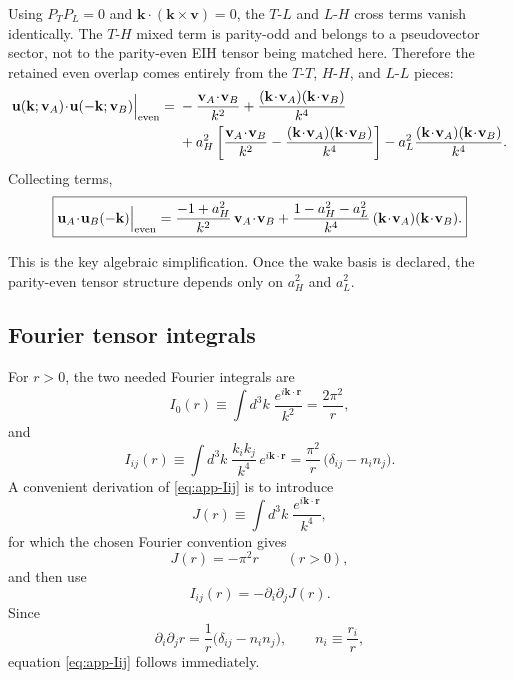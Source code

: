 \documentclass[11pt]{article}
\newcommand{\vct}{\mathbf v}
\begin{document}
Using \(P_TP_L=0\) and \(\mathbf k\!\cdot\!(\mathbf k\times\vct)=0\), the
\(T\)-\(L\) and \(L\)-\(H\) cross terms vanish identically. The \(T\)-\(H\) mixed term is
parity-odd and belongs to a pseudovector sector, not to the parity-even EIH tensor being
matched here. Therefore the retained even overlap comes entirely from the
\(T\)-\(T\), \(H\)-\(H\), and \(L\)-\(L\) pieces:
\begin{align}
\mathbf u(\mathbf k;\vct_A)\!\cdot\!\mathbf u(-\mathbf k;\vct_B)\Big|_{\rm even}
={}&
-\frac{\vct_A\!\cdot\!\vct_B}{k^2}
+\frac{(\mathbf k\!\cdot\!\vct_A)(\mathbf k\!\cdot\!\vct_B)}{k^4}
\nonumber\\
&
+a_H^2
\left[
\frac{\vct_A\!\cdot\!\vct_B}{k^2}
-\frac{(\mathbf k\!\cdot\!\vct_A)(\mathbf k\!\cdot\!\vct_B)}{k^4}
\right]
-a_L^2\frac{(\mathbf k\!\cdot\!\vct_A)(\mathbf k\!\cdot\!\vct_B)}{k^4}.
\label{eq:app-overlap-even-raw}
\end{align}
Collecting terms,
\begin{equation}
\boxed{
\mathbf u_A\!\cdot\!\mathbf u_B(-\mathbf k)\Big|_{\rm even}
=
\frac{-1+a_H^2}{k^2}\,\vct_A\!\cdot\!\vct_B
+
\frac{1-a_H^2-a_L^2}{k^4}\,
(\mathbf k\!\cdot\!\vct_A)(\mathbf k\!\cdot\!\vct_B).
}
\label{eq:app-overlap-even-collected}
\end{equation}

This is the key algebraic simplification. Once the wake basis is declared, the parity-even
tensor structure depends only on \(a_H^2\) and \(a_L^2\).

\subsection{Fourier tensor integrals}
\label{app:wake-fourier-integrals}

For \(r>0\), the two needed Fourier integrals are
\begin{equation}
I_0(r)
\equiv
\int d^3k\;\frac{e^{i\mathbf k\cdot\mathbf r}}{k^2}
=
\frac{2\pi^2}{r},
\label{eq:app-I0}
\end{equation}
and
\begin{equation}
I_{ij}(r)
\equiv
\int d^3k\;\frac{k_i k_j}{k^4}\,e^{i\mathbf k\cdot\mathbf r}
=
\frac{\pi^2}{r}\,\bigl(\delta_{ij}-n_i n_j\bigr).
\label{eq:app-Iij}
\end{equation}
A convenient derivation of \eqref{eq:app-Iij} is to introduce
\begin{equation}
J(r)\equiv \int d^3k\;\frac{e^{i\mathbf k\cdot\mathbf r}}{k^4},
\label{eq:app-J-def}
\end{equation}
for which the chosen Fourier convention gives
\begin{equation}
J(r)=-\pi^2 r
\qquad (r>0),
\label{eq:app-J-result}
\end{equation}
and then use
\begin{equation}
I_{ij}(r)= -\partial_i\partial_j J(r).
\label{eq:app-Iij-from-J}
\end{equation}
Since
\begin{equation}
\partial_i\partial_j r
=
\frac{1}{r}\bigl(\delta_{ij}-n_i n_j\bigr),
\qquad
n_i\equiv \frac{r_i}{r},
\label{eq:app-second-derivative-r}
\end{equation}
equation \eqref{eq:app-Iij} follows immediately.
\end{document}
